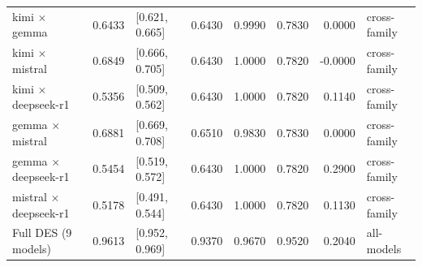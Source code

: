 \begin{tabular}{lrlrrrrl}
kimi $\times$ gemma & 0.6433 & [0.621, 0.665] & 0.6430 & 0.9990 & 0.7830 & 0.0000 & cross-family \\
kimi $\times$ mistral & 0.6849 & [0.666, 0.705] & 0.6430 & 1.0000 & 0.7820 & -0.0000 & cross-family \\
kimi $\times$ deepseek-r1 & 0.5356 & [0.509, 0.562] & 0.6430 & 1.0000 & 0.7820 & 0.1140 & cross-family \\
gemma $\times$ mistral & 0.6881 & [0.669, 0.708] & 0.6510 & 0.9830 & 0.7830 & 0.0000 & cross-family \\
gemma $\times$ deepseek-r1 & 0.5454 & [0.519, 0.572] & 0.6430 & 1.0000 & 0.7820 & 0.2900 & cross-family \\
mistral $\times$ deepseek-r1 & 0.5178 & [0.491, 0.544] & 0.6430 & 1.0000 & 0.7820 & 0.1130 & cross-family \\
Full DES (9 models) & 0.9613 & [0.952, 0.969] & 0.9370 & 0.9670 & 0.9520 & 0.2040 & all-models \\
\bottomrule
\end{tabular}
